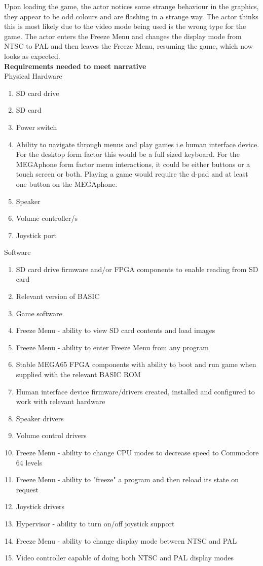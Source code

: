 Upon loading the game, the actor notices some strange behaviour in the graphics, they appear to be odd colours and are flashing in a strange way. The actor thinks this is most likely due to the video mode being used is the wrong type for the game. The actor enters the Freeze Menu and changes the display mode from NTSC to PAL and then leaves the Freeze Menu, resuming the game, which now looks as expected.\\

\textbf{Requirements needed to meet narrative}\\
Physical Hardware
\begin{enumerate}
\item SD card drive
\item SD card
\item Power switch
\item Ability to navigate through menus and play games i.e human interface device. For the desktop form factor this would be a full sized keyboard. For the MEGAphone form factor menu interactions, it could be either buttons or a touch screen or both. Playing a game would require the d-pad and at least one button on the MEGAphone.
\item Speaker
\item Volume controller/s
\item Joystick port
\end{enumerate}

Software\\
\begin{enumerate}
\item SD card drive firmware and/or FPGA components to enable reading from SD card
\item Relevant version of BASIC 
\item Game software
\item Freeze Menu - ability to view SD card contents and load images
\item Freeze Menu - ability to enter Freeze Menu from any program
\item Stable MEGA65 FPGA components with ability to boot and run game when supplied with the relevant BASIC ROM
\item Human interface device firmware/drivers created, installed and configured to work with relevant hardware
\item Speaker drivers
\item Volume control drivers 
\item Freeze Menu - ability to change CPU modes to decrease speed to Commodore 64 levels
\item Freeze Menu - ability to "freeze" a program and then reload its state on request
\item Joystick drivers
\item Hypervisor - ability to turn on/off joystick support
\item Freeze Menu - ability to change display mode between NTSC and PAL
\item Video controller capable of doing both NTSC and PAL display modes
\end{enumerate}

